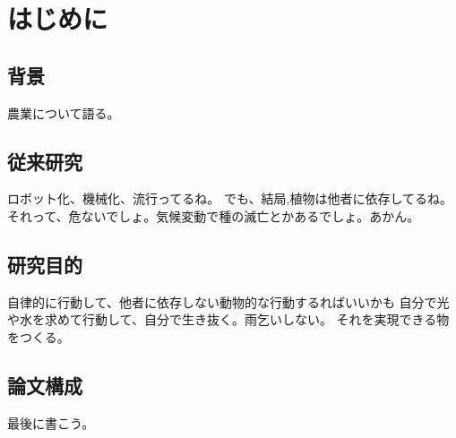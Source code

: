 \chapter{はじめに}
\section{背景}
農業について語る。
\section{従来研究}
ロボット化、機械化、流行ってるね。
でも、結局,植物は他者に依存してるね。
それって、危ないでしょ。気候変動で種の滅亡とかあるでしょ。あかん。
\section{研究目的}
自律的に行動して、他者に依存しない動物的な行動するればいいかも
自分で光や水を求めて行動して、自分で生き抜く。雨乞いしない。
それを実現できる物をつくる。
\section{論文構成}
最後に書こう。
